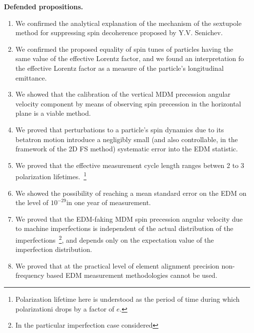 \textbf{Defended propositions.}
\begin{enumerate}
	\item We confirmed the analytical explanation of the mechanism of the sextupole method for
        suppressing spin decoherence proposed by Y.V. Senichev. %
  	\item We confirmed the proposed equality of spin tunes of particles having the same value of the
        effective Lorentz factor, and we found an interpretation fo the effective Lorentz factor as
        a measure of the particle's longitudinal emittance. %
  	\item We showed that the calibration of the vertical MDM precession angular velocity component
        by means of observing spin precession in the horizontal plane is a viable method.
  	\item We proved that perturbations to a particle's spin dynamics due to its betatron motion
        introduce a negligibly small (and also controllable, in the framework of the
        2D FS method) systematic error into the EDM statistic. %
  	\item We proved that the effective measurement cycle length ranges betwen 2 to 3
        polarization lifetimes.~\footnote{Polarization lifetime here is understood as
        the period of time during which polarizationi drops by a factor of $e$.}
  	\item We showed the possibility of reaching a mean standard error on the EDM on
        the level of $10^{-29}$\ecm in one year of measurement. %
  	\item We proved that the EDM-faking MDM spin precession angular velocity due to machine
        imperfections is independent of the actual distribution of the imperfections~\footnote{
        In the particular imperfection case considered}, and depends only on the expectation value of the
        imperfection distribution. %
  	\item We proved that at the practical level of element alignment precision non-frequency
        based EDM measurement methodologies cannot be used.
\end{enumerate}
